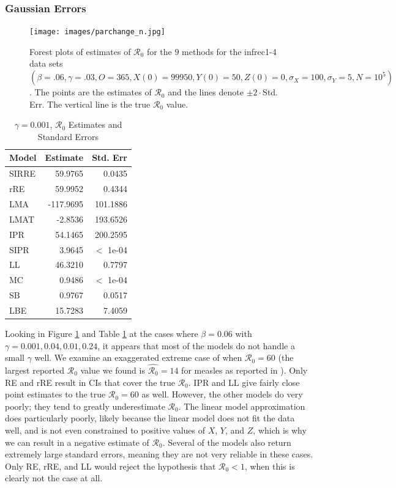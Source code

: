 \documentclass[12pt]{article}
\newcommand{\xxsir}{\ensuremath{9} } %
\newcommand{\rr}{\ensuremath{\mathcal{R}_0}}
\begin{document}
\subsubsection{Gaussian Errors}

\begin{figure}[H]
  \centering
  \texttt{[image: images/parchange\_n.jpg]}
  \caption{Forest plots of estimates of $\rr$ for the \xxsir methods for the infrec1-4 data sets $(\beta=.06, \gamma=.03, O=365, X(0)=99950, Y(0)=50, Z(0)=0, \sigma_X=100, \sigma_Y=5, N=10^5)$.  The points are the estimates of $\rr$ and the lines denote $\pm 2\cdot $Std. Err.  The vertical line is the true $\rr$ value.}
  \label{fig:infrec1-res}
\end{figure}
\begin{table}[H]

	\centering
	\begin{tabular}[t]{l|r|r}
		\hline
		Model & Estimate & Std. Err\\
		\hline
		SIRRE & 59.9765 & 0.0435\\
		\hline
		rRE & 59.9952 & 0.4344\\
		\hline
		LMA &  -117.9695 & 101.1886 \\
		\hline
		LMAT & -2.8536 & 193.6526 \\
		\hline
		IPR & 54.1465 & 200.2595\\
		\hline
		SIPR & 3.9645 & $<$ 1e-04\\
		\hline
		LL & 46.3210 & 0.7797\\
		\hline
		MC & 0.9486 & $<$ 1e-04 \\
		\hline
		SB & 0.9767 & 0.0517\\
		\hline
		LBE & 15.7283 & 7.4059\\
		\hline
	\end{tabular}
        \caption{\label{tab:infrec1-res}$\gamma = 0.001$, $\rr$ Estimates and Standard Errors}
\end{table}

Looking in Figure \ref{fig:infrec1-res} and Table \ref{tab:infrec1-res} at the cases where $\beta = 0.06$ with $\gamma = 0.001, 0.04, 0.01, 0.24$, it appears that most of the models do not handle a small $\gamma$ well.  We examine an exaggerated extreme case of when $\rr=60$ (the largest reported $\rr$ value we found is $\hat{\rr}=14$ for measles as reported in \cite{anderson1992}). Only RE and rRE result in CIs that cover the true $\rr$. IPR and LL give fairly close point estimates to the true $\rr=60$ as well. However, the other models do very poorly; they tend to greatly underestimate $\rr$. The linear model approximation does particularly poorly, likely because the linear model does not fit the data well, and is not even constrained to positive values of $X$, $Y$, and $Z$, which is why we can result in a negative estimate of $\rr$. Several of the models also return extremely large standard errors, meaning they are not very reliable in these cases.  Only RE, rRE, and LL would reject the hypothesis that $\rr <1$, when this is clearly not the case at all.
\end{document}
